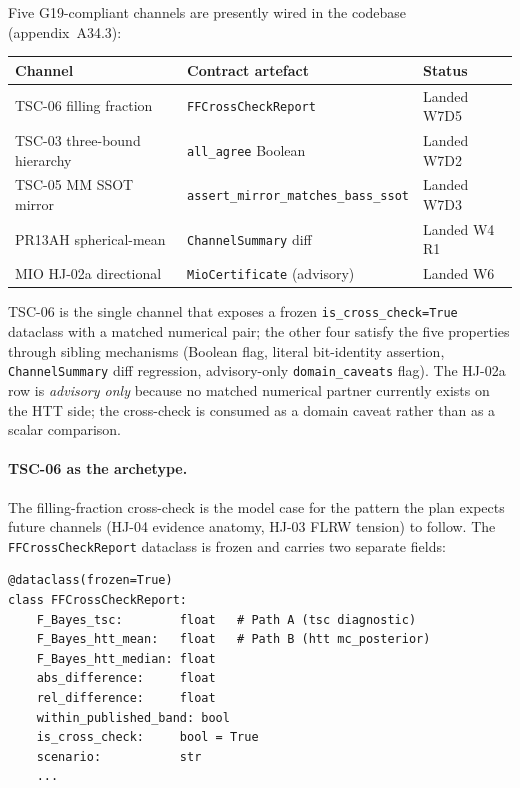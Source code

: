 Five G19-compliant channels are presently wired in the
codebase (appendix~A34.3):

\begin{center}
\small
\begin{tabular}{lll}
\hline\hline
Channel & Contract artefact & Status \\
\hline
TSC-06 filling fraction
  & \texttt{FFCrossCheckReport}
  & Landed W7D5 \\
TSC-03 three-bound hierarchy
  & \texttt{all\_agree} Boolean
  & Landed W7D2 \\
TSC-05 MM SSOT mirror
  & \texttt{assert\_mirror\_matches\_bass\_ssot}
  & Landed W7D3 \\
PR13AH spherical-mean
  & \texttt{ChannelSummary} diff
  & Landed W4 R1 \\
MIO HJ-02a directional
  & \texttt{MioCertificate} (advisory)
  & Landed W6 \\
\hline\hline
\end{tabular}
\end{center}

TSC-06 is the single channel that exposes a frozen
\texttt{is\_cross\_check=True} dataclass with a matched
numerical pair; the other four satisfy the five properties
through sibling mechanisms (Boolean flag, literal
bit-identity assertion, \texttt{ChannelSummary} diff
regression, advisory-only \texttt{domain\_caveats} flag).
The HJ-02a row is \emph{advisory only} because no matched
numerical partner currently exists on the HTT side; the
cross-check is consumed as a domain caveat rather than as a
scalar comparison.

\paragraph{TSC-06 as the archetype.}

The filling-fraction cross-check is the model case for the
pattern the plan expects future channels (HJ-04 evidence
anatomy, HJ-03 FLRW tension) to follow.  The
\texttt{FFCrossCheckReport} dataclass is frozen and carries
two separate fields:

\begin{verbatim}
@dataclass(frozen=True)
class FFCrossCheckReport:
    F_Bayes_tsc:        float   # Path A (tsc diagnostic)
    F_Bayes_htt_mean:   float   # Path B (htt mc_posterior)
    F_Bayes_htt_median: float
    abs_difference:     float
    rel_difference:     float
    within_published_band: bool
    is_cross_check:     bool = True
    scenario:           str
    ...
\end{verbatim}

